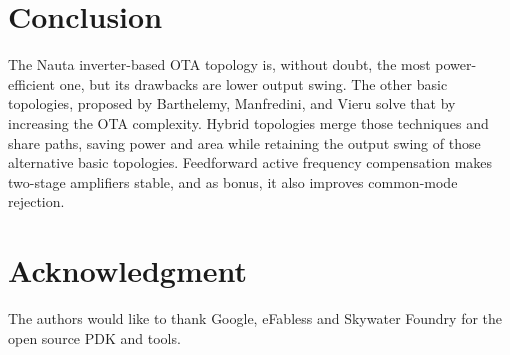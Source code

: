 \documentclass[conference]{IEEEtran}
\begin{document}
	\section{Conclusion}\label{section:conclusion}
	
	The Nauta inverter-based OTA topology is, without doubt, the most power-efficient one, but its drawbacks are lower output swing. The other basic topologies, proposed by Barthelemy, Manfredini, and Vieru solve that by increasing the OTA complexity. Hybrid topologies merge those techniques and share paths, saving power and area while retaining the output swing of those alternative basic topologies. Feedforward active frequency compensation makes two-stage amplifiers stable, and as bonus, it also improves common-mode rejection.
	
	\section*{Acknowledgment}
	
	The authors would like to thank Google, eFabless and Skywater Foundry for the open source PDK and tools.
	
	
	
	
	
	
	
\end{document}
